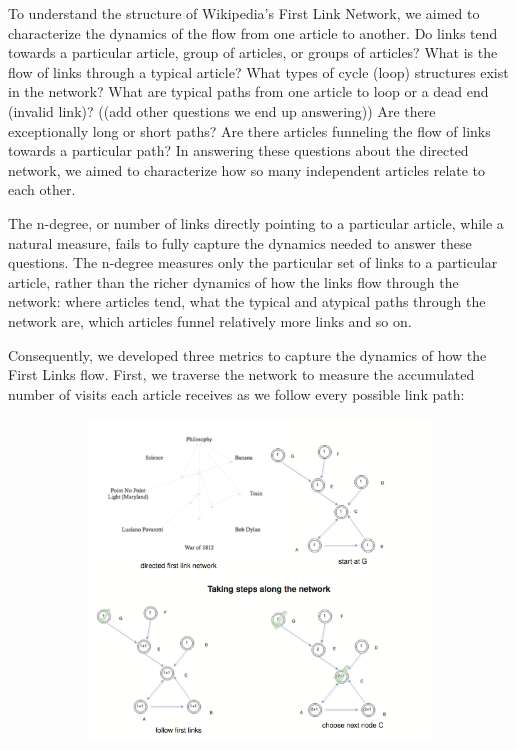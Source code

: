 \documentclass[twoside]{article}
\begin{document}
To understand the structure of Wikipedia's First Link Network, we
aimed to characterize the dynamics of the flow from one article to another. 
Do links tend towards a particular article, group of articles, or groups of articles? 
What is the flow of links through a typical article?
What types of cycle (loop) structures exist in the network?
What are typical paths from one article to loop or a dead end (invalid link)? 
((add other questions we end up answering))
Are there exceptionally long or short paths? 
Are there articles funneling the flow of links towards a particular path?
In answering these questions about the directed network, we aimed to characterize 
how so many independent articles relate to each other.

The n-degree, or number of links directly pointing to a particular article,
while a natural measure, fails to fully capture the dynamics needed to answer these questions.
The n-degree measures only the particular set of links to a particular article, 
rather than the richer dynamics of how the links flow through the network: 
where articles tend, what the typical and atypical 
paths through the network are, which articles funnel relatively more links and so on. 

Consequently, we developed three metrics to capture the dynamics of how the First Links flow. 
First, we traverse the network to measure the accumulated number of visits each article receives as we 
follow every possible link path: \\

\begin{figure}[H]
\centering
    \caption{traversing the network}
\begin{subfigure}[b]{0.8\textwidth}
    \includegraphics[width=\textwidth]{graphics/traverse_algo.png}
\end{subfigure}
\end{figure}
\end{document}
